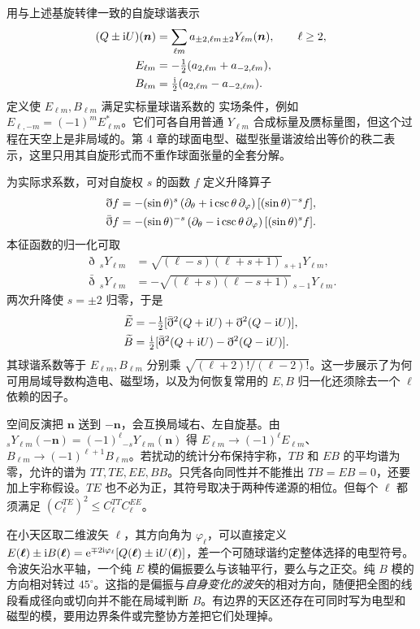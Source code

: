 用与上述基旋转律一致的自旋球谐表示
\[
 \begin{aligned}
 (Q\pm\mathrm{i} U)(\bm n)&=\sum_{\ell m}a_{\pm2,\ell m}
                       {}_{\pm2}Y_{\ell m}(\bm n),\qquad \ell\ge2,\\
 E_{\ell m}&=-\tfrac12(a_{2,\ell m}+a_{-2,\ell m}),\\
 B_{\ell m}&=\tfrac{\mathrm{i}}{2}(a_{2,\ell m}-a_{-2,\ell m}).
 \end{aligned}
\]
定义使 $E_{\ell m},B_{\ell m}$ 满足实标量球谐系数的 实场条件，例如 $E_{\ell,-m}=(-1)^mE_{\ell m}^*$。它们可各自用普通 $Y_{\ell m}$ 合成标量及赝标量图，但这个过程在天空上是非局域的。第 4 章的球面电型、磁型张量谐波给出等价的秩二表示，这里只用其自旋形式而不重作球面张量的全套分解。

为实际求系数，可对自旋权 $s$ 的函数 $f$ 定义升降算子
\[
 \begin{aligned}
 \eth f&=-(\sin\theta)^s
       \left(\partial_\theta+\mathrm{i}\csc\theta\,\partial_\varphi\right)
                 [(\sin\theta)^{-s}f],\\
 \bar\eth f&=-(\sin\theta)^{-s}
       \left(\partial_\theta-\mathrm{i}\csc\theta\,\partial_\varphi\right)
                 [(\sin\theta)^s f].
 \end{aligned}
\]
本征函数的归一化可取
\[
 \begin{aligned}
 \eth\,{}_sY_{\ell m}
   &=\sqrt{(\ell-s)(\ell+s+1)}\,{}_{s+1}Y_{\ell m},\\
 \bar\eth\,{}_sY_{\ell m}
   &=-\sqrt{(\ell+s)(\ell-s+1)}\,{}_{s-1}Y_{\ell m}.
 \end{aligned}
\]两次升降使 $s=\pm2$ 归零，于是
\begin{align*}
 \widetilde E&=-\tfrac12[\bar\eth^2(Q+\mathrm{i} U)+\eth^2(Q-\mathrm{i} U)],\\
 \widetilde B&=\tfrac{\mathrm{i}}{2}[\bar\eth^2(Q+\mathrm{i} U)-\eth^2(Q-\mathrm{i} U)] .
\end{align*}
其球谐系数等于 $E_{\ell m},B_{\ell m}$ 分别乘 $\sqrt{(\ell+2)!/(\ell-2)!}$。这一步展示了为何可用局域导数构造电、磁型场，以及为何恢复常用的 $E,B$ 归一化还须除去一个 $\ell$ 依赖的因子。

空间反演把 $\bm n$ 送到 $-\bm n$，会互换局域右、左自旋基。由 ${}_sY_{\ell m}(-\bm n)=(-1)^\ell{}_{-s}Y_{\ell m}(\bm n)$ 得 $E_{\ell m}\to(-1)^\ell E_{\ell m}$、$B_{\ell m}\to(-1)^{\ell+1}B_{\ell m}$。若扰动的统计分布保持宇称，$TB$ 和 $EB$ 的平均谱为零，允许的谱为 $TT,TE,EE,BB$。只凭各向同性并不能推出 $TB=EB=0$，还要加上宇称假设。$TE$ 也不必为正，其符号取决于两种传递源的相位。但每个 $\ell$ 都须满足 $(C_\ell^{TE})^2\le C_\ell^{TT}C_\ell^{EE}$。

在小天区取二维波矢 $\bm\ell$，其方向角为 $\varphi_\ell$，可以直接定义 $E(\bm\ell)\pm\mathrm{i} B(\bm\ell)=
\mathrm{e}^{\mp2\mathrm{i}\varphi_\ell}[Q(\bm\ell)\pm\mathrm{i} U(\bm\ell)]$，差一个可随球谐约定整体选择的电型符号。令波矢沿水平轴，一个纯 $E$ 模的偏振要么与该轴平行，要么与之正交。纯 $B$ 模的方向相对转过 $45^\circ$。这指的是偏振与\emph{自身变化的波矢}的相对方向，随便把全图的线段看成径向或切向并不能在局域判断 $B$。有边界的天区还存在可同时写为电型和磁型的模，要用边界条件或完整协方差把它们处理掉。

